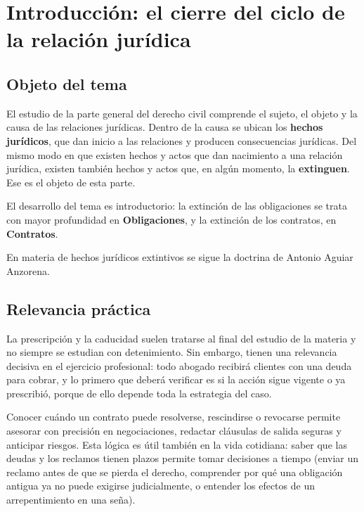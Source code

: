 \documentclass[12pt,oneside]{book}
\begin{document}
\chapter[Introducción a la extinción de las relaciones jurídicas]{Introducción: el cierre del ciclo de la relación jurídica}

\section{Objeto del tema}

El estudio de la parte general del derecho civil comprende el sujeto, el objeto y la causa de las relaciones jurídicas. Dentro de la causa se ubican los \textbf{hechos jurídicos}, que dan inicio a las relaciones y producen consecuencias jurídicas. Del mismo modo en que existen hechos y actos que dan nacimiento a una relación jurídica, existen también hechos y actos que, en algún momento, la \textbf{extinguen}. Ese es el objeto de esta parte.

\begin{note}
El desarrollo del tema es introductorio: la extinción de las obligaciones se trata con mayor profundidad en \textbf{Obligaciones}, y la extinción de los contratos, en \textbf{Contratos}.
\end{note}

En materia de hechos jurídicos extintivos se sigue la doctrina de Antonio Aguiar Anzorena.

\section{Relevancia práctica}

La prescripción y la caducidad suelen tratarse al final del estudio de la materia y no siempre se estudian con detenimiento. Sin embargo, tienen una relevancia decisiva en el ejercicio profesional: todo abogado recibirá clientes con una deuda para cobrar, y lo primero que deberá verificar es si la acción sigue vigente o ya prescribió, porque de ello depende toda la estrategia del caso.

Conocer cuándo un contrato puede resolverse, rescindirse o revocarse permite asesorar con precisión en negociaciones, redactar cláusulas de salida seguras y anticipar riesgos. Esta lógica es útil también en la vida cotidiana: saber que las deudas y los reclamos tienen plazos permite tomar decisiones a tiempo (enviar un reclamo antes de que se pierda el derecho, comprender por qué una obligación antigua ya no puede exigirse judicialmente, o entender los efectos de un arrepentimiento en una seña).
\end{document}
